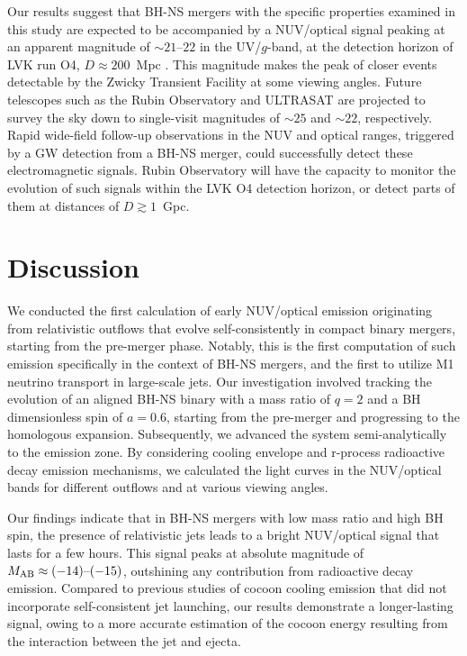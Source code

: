 \documentclass[twocolumn,dvipsnames]{aastex62}
\begin{document}
Our results suggest that BH-NS mergers with the specific properties examined in this study are expected to be accompanied by a NUV/optical signal peaking at an apparent magnitude of $ \sim 21 \mbox{--} 22 $ in the UV/$g$-band, at the detection horizon of LVK run O4, $ D \approx 200 $~Mpc \citep{Abbott2020}. This magnitude makes the peak of closer events detectable by the Zwicky Transient Facility \citep[ZTF;][]{Graham2019,Dekany2020} at some viewing angles. Future telescopes such as the Rubin Observatory \citep{LSST2009} and ULTRASAT \citep{Ben-Ami2022,Shvartzvald2023} are projected to survey the sky down to single-visit magnitudes of $ \sim 25 $ and $ \sim 22 $, respectively. Rapid wide-field follow-up observations in the NUV and optical ranges, triggered by a GW detection from a BH-NS merger, could successfully detect these electromagnetic signals. Rubin Observatory will have the capacity to monitor the evolution of such signals within the LVK O4 detection horizon, or detect parts of them at distances of $ D \gtrsim 1 $~Gpc.

\section{Discussion}\label{sec:discussion}

We conducted the first calculation of early NUV/optical emission originating from relativistic outflows that evolve self-consistently in compact binary mergers, starting from the pre-merger phase. Notably, this is the first computation of such emission specifically in the context of BH-NS mergers, and the first to utilize M1 neutrino transport in large-scale jets. Our investigation involved tracking the evolution of an aligned BH-NS binary with a mass ratio of $ q = 2 $ and a BH dimensionless spin of $ a = 0.6 $, starting from the pre-merger and progressing to the homologous expansion. Subsequently, we advanced the system semi-analytically to the emission zone. By considering cooling envelope and r-process radioactive decay emission mechanisms, we calculated the light curves in the NUV/optical bands for different outflows and at various viewing angles.

Our findings indicate that in BH-NS mergers with low mass ratio and high BH spin, the presence of relativistic jets leads to a bright NUV/optical signal that lasts for a few hours. This signal peaks at absolute magnitude of $M_{\rm AB} \approx (-14)\mbox{--}(-15)$, outshining any contribution from radioactive decay emission. Compared to previous studies of cocoon cooling emission that did not incorporate self-consistent jet launching, our results demonstrate a longer-lasting signal, owing to a more accurate estimation of the cocoon energy resulting from the interaction between the jet and ejecta.
\end{document}

